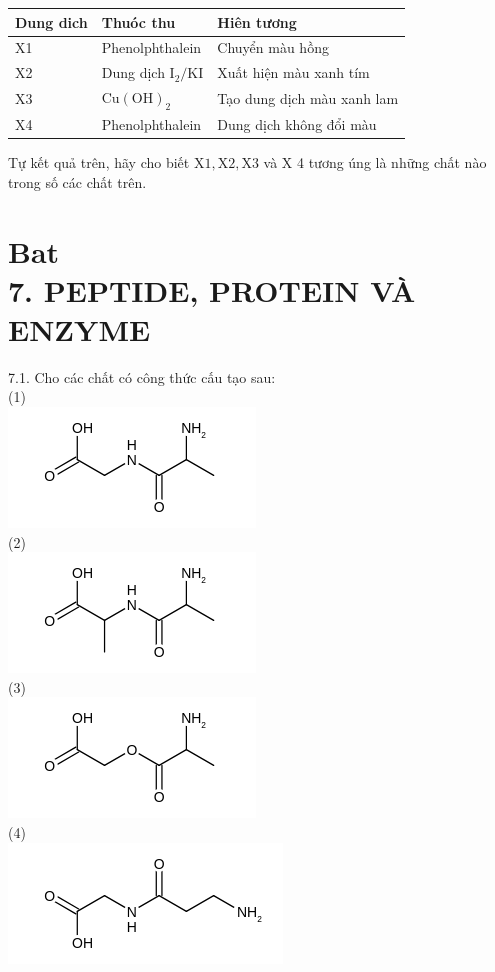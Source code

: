 \documentclass[10pt]{article}
\begin{document}
\begin{center}
\begin{tabular}{|l|l|l|}
\hline
Dung dich & Thuóc thu & Hiên tương \\
\hline
X1 & Phenolphthalein & Chuyển màu hồng \\
\hline
X2 & Dung dịch $\mathrm{I}_{2} / \mathrm{KI}$ & Xuất hiện màu xanh tím \\
\hline
X3 & $\mathrm{Cu}(\mathrm{OH})_{2}$ & Tạo dung dịch màu xanh lam \\
\hline
X4 & Phenolphthalein & Dung dịch không đổi màu \\
\hline
\end{tabular}
\end{center}

Tự kết quả trên, hãy cho biết $\mathrm{X} 1, \mathrm{X} 2, \mathrm{X} 3$ và X 4 tương úng là những chất nào trong số các chất trên.

\section*{Bat \\
 7. PEPTIDE, PROTEIN VÀ ENZYME}
7.1. Cho các chất có công thức cấu tạo sau:\\
(1)\\
\includegraphics{smile-d5ede381df55cc8a6df7babb2182e99baa2a6392}\\
(2)\\
\includegraphics{smile-2149c9af4dce087056af9eaa6d7e3cab32ae50c6}\\
(3)\\
\includegraphics{smile-9c9cb2317cf9ecc7e76f30cf5e40116eea34611b}\\
(4)\\
\includegraphics{smile-ee574251b1cea5ca6d39d8f48566b3453006fd18}
\end{document}
